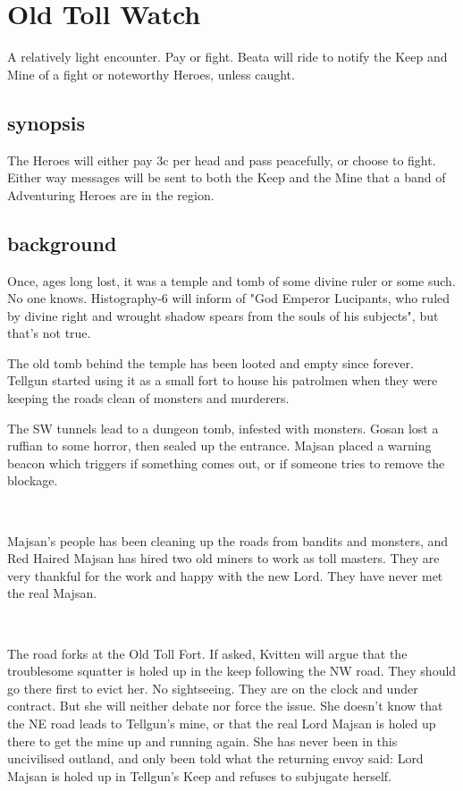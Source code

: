 \section*{Old Toll Watch}
A relatively light encounter. Pay or fight. Beata will ride to notify the Keep and Mine of a fight or noteworthy Heroes, unless caught.


\subsection*{synopsis}
The Heroes will either pay 3c per head and pass peacefully, or choose to fight. Either way messages will be sent to both the Keep and the Mine that a band of Adventuring Heroes are in the region.


\subsection*{background}
Once, ages long lost, it was a temple and tomb of some divine ruler or some such. No one knows. Histography-6 will inform of "God Emperor Lucipants, who ruled by divine right and wrought shadow spears from the souls of his subjects", but that's not true.

The old tomb behind the temple has been looted and empty since forever. Tellgun started using it as a small fort to house his patrolmen when they were keeping the roads clean of monsters and murderers.

The SW tunnels lead to a dungeon tomb, infested with monsters. Gosan lost a ruffian to some horror, then sealed up the entrance. Majsan placed a warning beacon which triggers if something comes out, or if someone tries to remove the blockage.

\

Majsan's people has been cleaning up the roads from bandits and monsters, and Red Haired Majsan has hired two old miners to work as toll masters. They are very thankful for the work and happy with the new Lord. They have never met the real Majsan.

\

The road forks at the Old Toll Fort. If asked, Kvitten will argue that the troublesome squatter is holed up in the keep following the NW road. They should go there first to evict her. No sightseeing. They are on the clock and under contract. But she will neither debate nor force the issue. She doesn't know that the NE road leads to Tellgun's mine, or that the real Lord Majsan is holed up there to get the mine up and running again. She has never been in this uncivilised outland, and only been told what the returning envoy said: Lord Majsan is holed up in Tellgun's Keep and refuses to subjugate herself.


